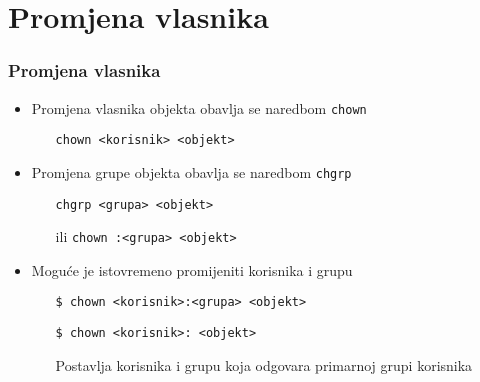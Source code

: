 \documentclass[table,usenames,dvipsnames]{beamer}
\newcommand{\shell}[1]{\texttt{#1}}
\begin{document}
\section{Promjena vlasnika}
\begin{frame}[t]
\frametitle{Promjena vlasnika}
\begin{itemize}
  \item Promjena vlasnika objekta obavlja se naredbom \shell{chown}
  \begin{itemize}
    \item[] \shell{chown <korisnik> <objekt>}
  \end{itemize}
	\item Promjena grupe objekta obavlja se naredbom \shell{chgrp}
	\begin{itemize}
		\item[] \shell{chgrp <grupa> <objekt>}
		\item[ili] \shell{chown :<grupa> <objekt>}
	\end{itemize}
\end{itemize}
\vfill
\begin{itemize}
  \item Moguće je istovremeno promijeniti korisnika i grupu
  \begin{itemize}
    \item[] \shell{\$ chown <korisnik>:<grupa> <objekt>}
    \item[] \vspace{1em} \shell{\$ chown <korisnik>: <objekt>}
	\item[] Postavlja korisnika i grupu koja odgovara primarnoj grupi korisnika
  \end{itemize}
\end{itemize}
\end{frame}
\end{document}
